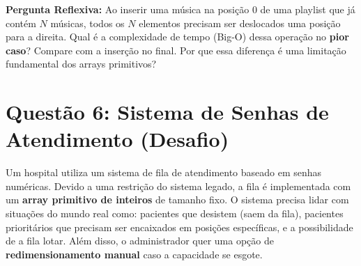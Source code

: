 \documentclass[12pt, a4paper]{article}
\begin{document}
\textbf{Pergunta Reflexiva:} Ao inserir uma música na posição 0 de uma playlist que já contém $N$ músicas, todos os $N$ elementos precisam ser deslocados uma posição para a direita. Qual é a complexidade de tempo (Big-O) dessa operação no \textbf{pior caso}? Compare com a inserção no final. Por que essa diferença é uma limitação fundamental dos arrays primitivos?

\vspace{0.2cm}

\section*{Questão 6: Sistema de Senhas de Atendimento (Desafio)}
Um hospital utiliza um sistema de fila de atendimento baseado em senhas numéricas. Devido a uma restrição do sistema legado, a fila é implementada com um \textbf{array primitivo de inteiros} de tamanho fixo. O sistema precisa lidar com situações do mundo real como: pacientes que desistem (saem da fila), pacientes prioritários que precisam ser encaixados em posições específicas, e a possibilidade de a fila lotar. Além disso, o administrador quer uma opção de \textbf{redimensionamento manual} caso a capacidade se esgote.
\end{document}
